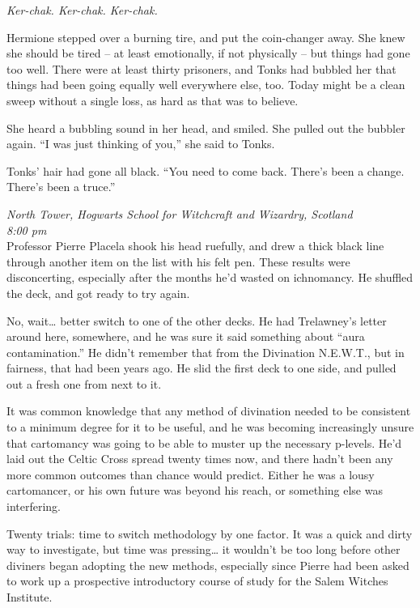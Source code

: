 \emph{Ker-chak. Ker-chak. Ker-chak.}

Hermione stepped over a burning tire, and put the coin-changer away. She
knew she should be tired -- at least emotionally, if not physically --
but things had gone too well. There were at least thirty prisoners, and
Tonks had bubbled her that things had been going equally well everywhere
else, too. Today might be a clean sweep without a single loss, as hard
as that was to believe.

She heard a bubbling sound in her head, and smiled. She pulled out the
bubbler again. ``I was just thinking of you,'' she said to Tonks.

Tonks' hair had gone all black. ``You need to come back. There's been a
change. There's been a truce.''

\mybreak

\emph{North Tower, Hogwarts School for Witchcraft and Wizardry,
Scotland}\\
\emph{8:00 pm}\\

Professor Pierre Placela shook his head ruefully, and drew a thick black
line through another item on the list with his felt pen. These results
were disconcerting, especially after the months he'd wasted on
ichnomancy. He shuffled the deck, and got ready to try again.

No, wait\ldots{} better switch to one of the other decks. He had
Trelawney's letter around here, somewhere, and he was sure it said
something about ``aura contamination.'' He didn't remember that from the
Divination N.E.W.T., but in fairness, that had been years ago. He slid
the first deck to one side, and pulled out a fresh one from next to it.

It was common knowledge that any method of divination needed to be
consistent to a minimum degree for it to be useful, and he was becoming
increasingly unsure that cartomancy was going to be able to muster up
the necessary p-levels. He'd laid out the Celtic Cross spread twenty
times now, and there hadn't been any more common outcomes than chance
would predict. Either he was a lousy cartomancer, or his own future was
beyond his reach, or something else was interfering.

Twenty trials: time to switch methodology by one factor. It was a quick
and dirty way to investigate, but time was pressing\ldots{} it wouldn't
be too long before other diviners began adopting the new methods,
especially since Pierre had been asked to work up a prospective
introductory course of study for the Salem Witches Institute.

